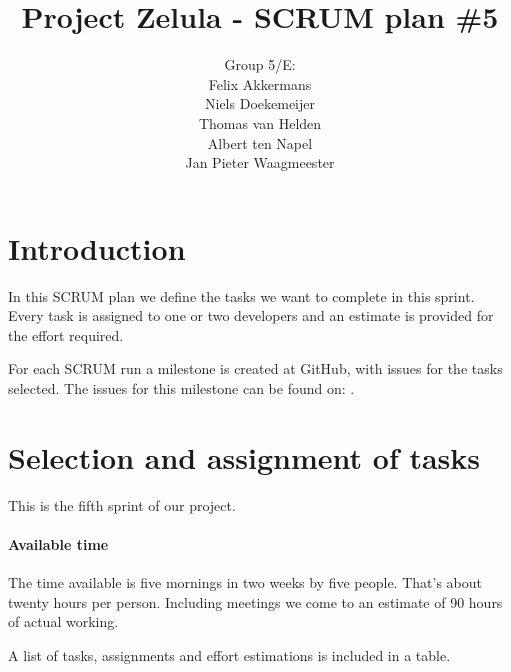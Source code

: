 \documentclass[a4paper]{article}
\title{Project Zelula - SCRUM plan \#5}
\author{Group 5/E:\\
Felix Akkermans \\
Niels Doekemeijer \\
Thomas van Helden \\
Albert ten Napel \\
Jan Pieter Waagmeester}
\begin{document}
\maketitle

\section{Introduction}
In this SCRUM plan we define the tasks we want to complete in this sprint. Every task is assigned to one or two developers and an estimate is provided for the effort required.

For each SCRUM run a milestone is created at GitHub, with issues for the tasks selected. The issues for this milestone can be found on: .

\section{Selection and assignment of tasks}
This is the fifth sprint of our project. 

\paragraph{Available time}
The time available is five mornings in two weeks by five people. That's about twenty hours per person. Including meetings we come to an estimate of 90 hours of actual working. 

A list of tasks, assignments and effort estimations is included in a table.
\end{document}
